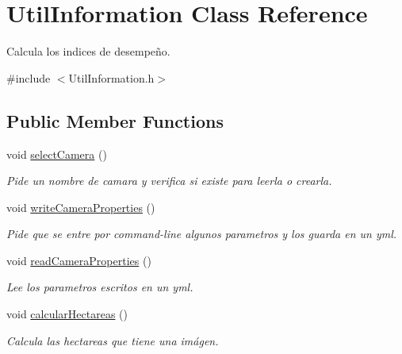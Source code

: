 \hypertarget{classUtilInformation}{}\section{Util\+Information Class Reference}
\label{classUtilInformation}


Calcula los indices de desempeño.  




{\ttfamily \#include $<$Util\+Information.\+h$>$}

\subsection*{Public Member Functions}
\begin{DoxyCompactItemize}
\item 
\mbox{\label{classUtilInformation_afec1ac4e05845098092d1e27a1ae338b}} 
void \mbox{\hyperlink{classUtilInformation_afec1ac4e05845098092d1e27a1ae338b}{select\+Camera}} ()
\begin{DoxyCompactList}\small\item\em Pide un nombre de camara y verifica si existe para leerla o crearla. \end{DoxyCompactList}\item 
\mbox{\label{classUtilInformation_a184ee49faaa5054067a5391276fed308}} 
void \mbox{\hyperlink{classUtilInformation_a184ee49faaa5054067a5391276fed308}{write\+Camera\+Properties}} ()
\begin{DoxyCompactList}\small\item\em Pide que se entre por command-\/line algunos parametros y los guarda en un yml. \end{DoxyCompactList}\item 
\mbox{\label{classUtilInformation_ad041e21d55e3e992304454196f52d30a}} 
void \mbox{\hyperlink{classUtilInformation_ad041e21d55e3e992304454196f52d30a}{read\+Camera\+Properties}} ()
\begin{DoxyCompactList}\small\item\em Lee los parametros escritos en un yml. \end{DoxyCompactList}\item 
void \mbox{\hyperlink{classUtilInformation_a47f1a60e6815a3b1642a3324c476fb32}{calcular\+Hectareas}} ()
\begin{DoxyCompactList}\small\item\em Calcula las hectareas que tiene una imágen. \end{DoxyCompactList}\item 

\end{DoxyCompactItemize}
